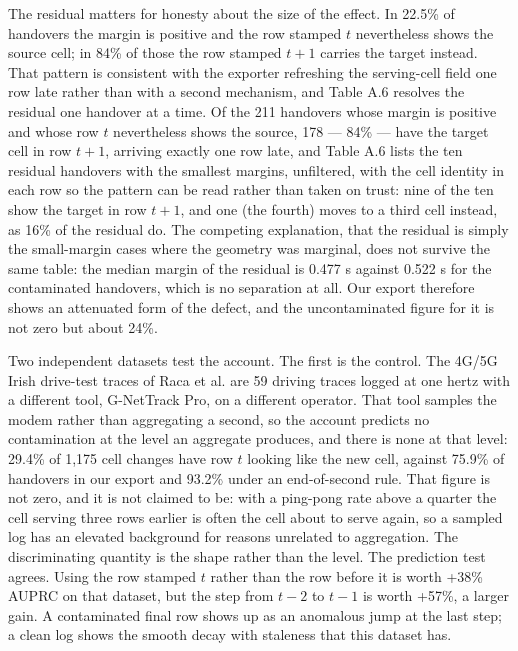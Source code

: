 The residual matters for honesty about the size of the effect. In 22.5\% of handovers the margin is positive and the row stamped $t$ nevertheless shows the source cell; in 84\% of those the row stamped $t+1$ carries the target instead. That pattern is consistent with the exporter refreshing the serving-cell field one row late rather than with a second mechanism, and Table A.6 resolves the residual one handover at a time. Of the 211 handovers whose margin is positive and whose row $t$ nevertheless shows the source, 178 --- 84\% --- have the target cell in row $t+1$, arriving exactly one row late, and Table A.6 lists the ten residual handovers with the smallest margins, unfiltered, with the cell identity in each row so the pattern can be read rather than taken on trust: nine of the ten show the target in row $t+1$, and one (the fourth) moves to a third cell instead, as 16\% of the residual do. The competing explanation, that the residual is simply the small-margin cases where the geometry was marginal, does not survive the same table: the median margin of the residual is 0.477 s against 0.522 s for the contaminated handovers, which is no separation at all. Our export therefore shows an attenuated form of the defect, and the uncontaminated figure for it is not zero but about 24\%.

Two independent datasets test the account. The first is the control. The 4G/5G Irish drive-test traces of Raca et al. \cite{ref37} are 59 driving traces logged at one hertz with a different tool, G-NetTrack Pro, on a different operator. That tool samples the modem rather than aggregating a second, so the account predicts no contamination at the level an aggregate produces, and there is none at that level: 29.4\% of 1,175 cell changes have row $t$ looking like the new cell, against 75.9\% of handovers in our export and 93.2\% under an end-of-second rule. That figure is not zero, and it is not claimed to be: with a ping-pong rate above a quarter the cell serving three rows earlier is often the cell about to serve again, so a sampled log has an elevated background for reasons unrelated to aggregation. The discriminating quantity is the shape rather than the level. The prediction test agrees. Using the row stamped $t$ rather than the row before it is worth +38\% AUPRC on that dataset, but the step from $t-2$ to $t-1$ is worth +57\%, a larger gain. A contaminated final row shows up as an anomalous jump at the last step; a clean log shows the smooth decay with staleness that this dataset has.

